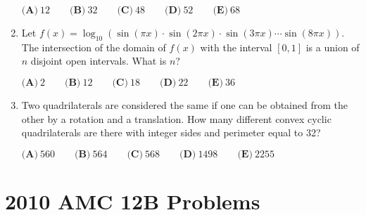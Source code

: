 \documentclass{article}
\begin{document}
\begin{enumerate}[label=\arabic*., itemsep=0.5em]
\(\textbf{(A)}\ 12 \qquad \textbf{(B)}\ 32 \qquad \textbf{(C)}\ 48 \qquad \textbf{(D)}\ 52 \qquad \textbf{(E)}\ 68\)\par \vspace{0.5em}\item Let \(f(x) = \log_{10} \left(\sin(\pi x) \cdot \sin(2 \pi x) \cdot \sin (3 \pi x) \cdots \sin(8 \pi x)\right)\). The intersection of the domain of \(f(x)\) with the interval \([0,1]\) is a union of \(n\) disjoint open intervals. What is \(n\)?

\(\textbf{(A)}\ 2 \qquad \textbf{(B)}\ 12 \qquad \textbf{(C)}\ 18 \qquad \textbf{(D)}\ 22 \qquad \textbf{(E)}\ 36\)\par \vspace{0.5em}\item Two quadrilaterals are considered the same if one can be obtained from the other by a rotation and a translation. How many different convex cyclic quadrilaterals are there with integer sides and perimeter equal to 32?

\(\textbf{(A)}\ 560 \qquad \textbf{(B)}\ 564 \qquad \textbf{(C)}\ 568 \qquad \textbf{(D)}\ 1498 \qquad \textbf{(E)}\ 2255\)\par \vspace{0.5em}\end{enumerate}\newpage\section*{2010 AMC 12B Problems}
\end{document}
